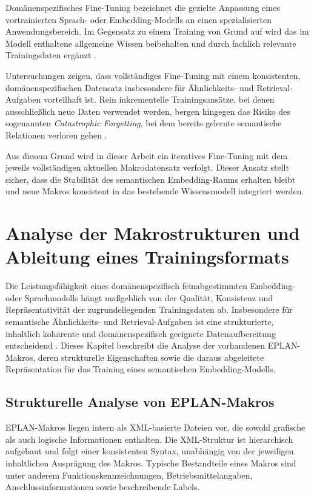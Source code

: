 Domänenspezifisches Fine-Tuning bezeichnet die gezielte Anpassung eines vortrainierten Sprach- oder Embedding-Modells an einen spezialisierten Anwendungsbereich. Im Gegensatz zu einem Training von Grund auf wird das im Modell enthaltene allgemeine Wissen beibehalten und durch fachlich relevante Trainingsdaten ergänzt \cite{parthasarathy_ultimate_2024}.

Untersuchungen zeigen, dass vollständiges Fine-Tuning mit einem konsistenten, domänenspezifischen Datensatz insbesondere für Ähnlichkeits- und Retrieval-Aufgaben vorteilhaft ist. Rein inkrementelle Trainingsansätze, bei denen ausschließlich neue Daten verwendet werden, bergen hingegen das Risiko des sogenannten \emph{Catastrophic Forgetting}, bei dem bereits gelernte semantische Relationen verloren gehen \cite{zhong_kaft_2025}.

Aus diesem Grund wird in dieser Arbeit ein iteratives Fine-Tuning mit dem jeweils vollständigen aktuellen Makrodatensatz verfolgt. Dieser Ansatz stellt sicher, dass die Stabilität des semantischen Embedding-Raums erhalten bleibt und neue Makros konsistent in das bestehende Wissensmodell integriert werden.





\chapter{Analyse der Makrostrukturen und Ableitung eines Trainingsformats}

Die Leistungsfähigkeit eines domänenspezifisch feinabgestimmten Embedding- oder Sprachmodells hängt maßgeblich von der Qualität, Konsistenz und Repräsentativität der zugrundeliegenden Trainingsdaten ab. Insbesondere für semantische Ähnlichkeits- und Retrieval-Aufgaben ist eine strukturierte, inhaltlich kohärente und domänenspezifisch geeignete Datenaufbereitung entscheidend \cite{parthasarathy_ultimate_2024}. Dieses Kapitel beschreibt die Analyse der vorhandenen EPLAN-Makros, deren strukturelle Eigenschaften sowie die daraus abgeleitete Repräsentation für das Training eines semantischen Embedding-Modells.

\section{Strukturelle Analyse von EPLAN-Makros}

EPLAN-Makros liegen intern als XML-basierte Dateien vor, die sowohl grafische als auch logische Informationen enthalten. Die XML-Struktur ist hierarchisch aufgebaut und folgt einer konsistenten Syntax, unabhängig von der jeweiligen inhaltlichen Ausprägung des Makros. Typische Bestandteile eines Makros sind unter anderem Funktionskennzeichnungen, Betriebsmittelangaben, Anschlussinformationen sowie beschreibende Labels.

